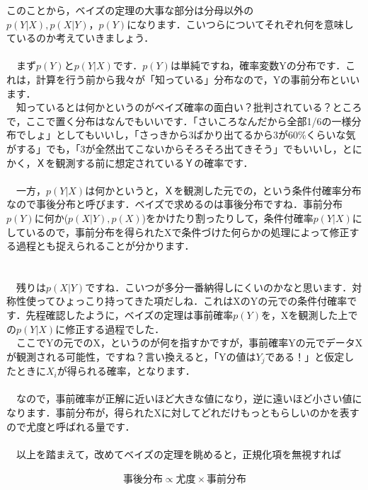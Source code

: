 \documentclass[11pt,a4paper,uplatex]{ujreport} 	%
\begin{document}
このことから，ベイズの定理の大事な部分は分母以外の$p(Y|X), p(X|Y)，p(Y)$になります．こいつらについてそれぞれ何を意味しているのか考えていきましょう．\\
\\
　まず$p(Y)$と$p(Y|X)$です．$p(Y)$は単純ですね，確率変数Yの分布です．これは，計算を行う前から我々が「知っている」分布なので，Yの事前分布といいます．\\
　知っているとは何かというのがベイズ確率の面白い？批判されている？ところで，ここで置く分布はなんでもいいです．「さいころなんだから全部1/6の一様分布でしょ」としてもいいし，「さっきから3ばかり出てるから3が60\%くらいな気がする」でも，「3が全然出てこないからそろそろ出てきそう」でもいいし，とにかく，Ｘを観測する前に想定されているＹの確率です．\\
\\
　一方，$p(Y|X)$は何かというと，Ｘを観測した元での，という条件付確率分布なので事後分布と呼びます．ベイズで求めるのは事後分布ですね．事前分布$p(Y)$に何か($p(X|Y), p(X)$)をかけたり割ったりして，条件付確率$p(Y|X)$にしているので，事前分布を得られたXで条件づけた何らかの処理によって修正する過程とも捉えられることが分かります．\\
\\
\\
　残りは$p(X|Y)$ですね．こいつが多分一番納得しにくいのかなと思います．対称性使ってひょっこり持ってきた項だしね．これはXのYの元での条件付確率です．先程確認したように，ベイズの定理は事前確率$p(Y)$を，Xを観測した上での$p(Y|X)$に修正する過程でした．\\
　ここでYの元でのX，というのが何を指すかですが，事前確率Yの元でデータXが観測される可能性，ですね？言い換えると，「Yの値は$Y_j$である！」と仮定したときに$X_i$が得られる確率，となります．\\
\\
　なので，事前確率が正解に近いほど大きな値になり，逆に遠いほど小さい値になります．事前分布が，得られたXに対してどれだけもっともらしいのかを表すので尤度と呼ばれる量です．\\
\\
　以上を踏まえて，改めてベイズの定理を眺めると，正規化項を無視すれば

\begin{align}
事後分布 \propto 尤度 \times 事前分布
\end{align}
\end{document}
